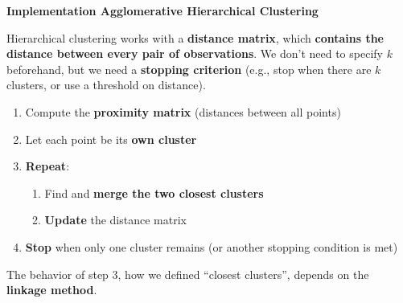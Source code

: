 \highspace
\begin{flushleft}
    \textcolor{Green3}{ \textbf{Implementation Agglomerative Hierarchical Clustering}}
\end{flushleft}
Hierarchical clustering works with a \textbf{distance matrix}, which \textbf{contains the distance between every pair of observations}. We don't need to specify $k$ beforehand, but we need a \textbf{stopping criterion} (e.g., stop when there are $k$ clusters, or use a threshold on distance).
\begin{enumerate}
    \item Compute the \textbf{proximity matrix} (distances between all points)
    \item Let each point be its \textbf{own cluster}
    \item \textbf{Repeat}:
    \begin{enumerate}
        \item Find and \textbf{merge the two closest clusters}
        \item \textbf{Update} the distance matrix
    \end{enumerate}
    \item \textbf{Stop} when only one cluster remains (or another stopping condition is met)
\end{enumerate}
The behavior of step 3, how we defined ``closest clusters'', depends on the \textbf{linkage method}.

\newpage

